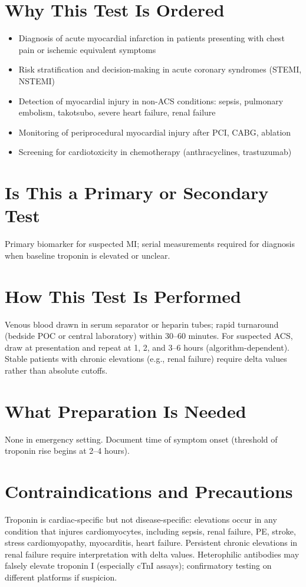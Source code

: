 \section*{Why This Test Is Ordered}
\begin{itemize}
  \item Diagnosis of acute myocardial infarction in patients presenting with chest pain or ischemic equivalent symptoms
  \item Risk stratification and decision-making in acute coronary syndromes (STEMI, NSTEMI)
  \item Detection of myocardial injury in non-ACS conditions: sepsis, pulmonary embolism, takotsubo, severe heart failure, renal failure
  \item Monitoring of periprocedural myocardial injury after PCI, CABG, ablation
  \item Screening for cardiotoxicity in chemotherapy (anthracyclines, trastuzumab)
\end{itemize}

\section*{Is This a Primary or Secondary Test}
Primary biomarker for suspected MI; serial measurements required for diagnosis when baseline troponin is elevated or unclear.

\section*{How This Test Is Performed}
Venous blood drawn in serum separator or heparin tubes; rapid turnaround (bedside POC or central laboratory) within 30--60 minutes. For suspected ACS, draw at presentation and repeat at 1, 2, and 3--6 hours (algorithm-dependent). Stable patients with chronic elevations (e.g., renal failure) require delta values rather than absolute cutoffs.

\section*{What Preparation Is Needed}
None in emergency setting. Document time of symptom onset (threshold of troponin rise begins at 2--4 hours).

\section*{Contraindications and Precautions}
Troponin is cardiac-specific but not disease-specific: elevations occur in any condition that injures cardiomyocytes, including sepsis, renal failure, PE, stroke, stress cardiomyopathy, myocarditis, heart failure. Persistent chronic elevations in renal failure require interpretation with delta values. Heterophilic antibodies may falsely elevate troponin I (especially cTnI assays); confirmatory testing on different platforms if suspicion.

